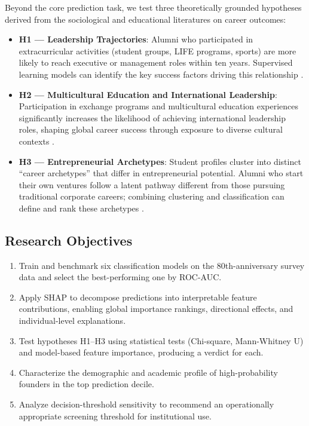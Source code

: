 \documentclass[10pt,twocolumn]{article}
\newenvironment{compactenum}{%
  \begin{enumerate}%
  \setlength{\itemsep}{1pt}\setlength{\parskip}{0pt}\setlength{\parsep}{0pt}%
}{\end{enumerate}}
\newenvironment{compactitem}{%
  \begin{itemize}%
  \setlength{\itemsep}{1pt}\setlength{\parskip}{0pt}\setlength{\parsep}{0pt}%
}{\end{itemize}}
\begin{document}
Beyond the core prediction task, we test three theoretically grounded
hypotheses derived from the sociological and educational literatures on
career outcomes:

\begin{compactitem}
  \item \textbf{H1 --- Leadership Trajectories}: Alumni who participated in
  extracurricular activities (student groups, LIFE programs, sports) are more
  likely to reach executive or management roles within ten years. Supervised
  learning models can identify the key success factors driving this
  relationship \cite{binani2024, lamhour2026}.

  \item \textbf{H2 --- Multicultural Education and International Leadership}:
  Participation in exchange programs and multicultural education experiences
  significantly increases the likelihood of achieving international leadership
  roles, shaping global career success through exposure to diverse cultural
  contexts \cite{maltseva2022, udayar2025}.

  \item \textbf{H3 --- Entrepreneurial Archetypes}: Student profiles cluster
  into distinct ``career archetypes'' that differ in entrepreneurial potential.
  Alumni who start their own ventures follow a latent pathway different from
  those pursuing traditional corporate careers; combining clustering and
  classification can define and rank these archetypes \cite{oliveira2020,
  sullivan2021}.
\end{compactitem}

\subsection{Research Objectives}

\begin{compactenum}
  \item Train and benchmark six classification models on the 80th-anniversary
  survey data and select the best-performing one by ROC-AUC.
  \item Apply SHAP to decompose predictions into interpretable feature
  contributions, enabling global importance rankings, directional effects, and
  individual-level explanations.
  \item Test hypotheses H1--H3 using statistical tests (Chi-square,
  Mann-Whitney U) and model-based feature importance, producing a verdict for
  each.
  \item Characterize the demographic and academic profile of high-probability
  founders in the top prediction decile.
  \item Analyze decision-threshold sensitivity to recommend an operationally
  appropriate screening threshold for institutional use.
\end{compactenum}
\end{document}
